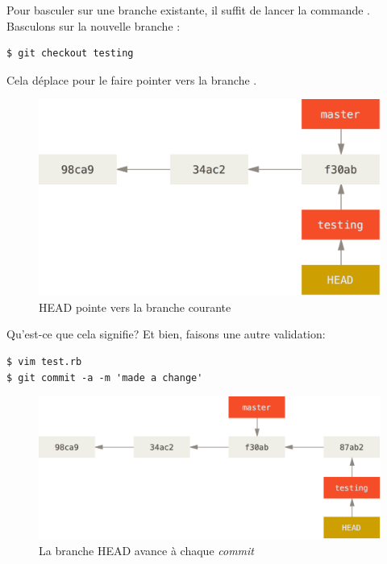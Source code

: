 Pour basculer sur une branche existante, il suffit de lancer la commande .
Basculons sur la nouvelle branche :
\begin{Schunk}
\begin{Verbatim}
$ git checkout testing
\end{Verbatim}
\end{Schunk}

Cela déplace  pour le faire pointer vers la branche .

\begin{figure}[H]
  \centering
  \includegraphics{images/head-to-testing}
  \caption{HEAD pointe vers la branche courante}
  \label{fig:git:head-to-testing}
\end{figure}

Qu'est-ce que cela signifie?
Et bien, faisons une autre validation:
\begin{Schunk}
\begin{Verbatim}
$ vim test.rb
$ git commit -a -m 'made a change'
\end{Verbatim}
\end{Schunk}

\begin{figure}[H]
  \centering
  \includegraphics{images/advance-testing}
  \caption{La branche HEAD avance à chaque \emph{commit}}
  \label{fig:git:advance-testing}
\end{figure}

